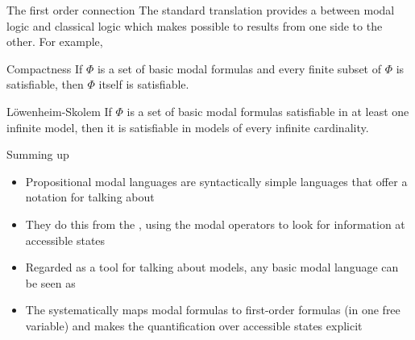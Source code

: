 \documentclass{beamer}
\begin{document}
\begin{slide}{The first order connection}\label{s:22}
\small
The standard translation provides a  between modal logic and classical logic
which makes possible to  results from one side to the other. For example,
\vspace{0.2cm}

\begin{block}{Compactness}
If $\Phi$ is a set of basic modal formulas and every finite subset of $\Phi$ is satisfiable, then $\Phi$ itself is satisfiable.
\end{block}

\begin{block}{L\"owenheim-Skolem}
If $\Phi$ is a set of basic modal formulas  satisfiable in at least one infinite model, then it is satisfiable in models of every infinite cardinality.
\end{block}
\end{slide}


\begin{slide}{Summing up}\label{s:23}
\small
\begin{itemize}
\item Propositional modal languages are syntactically simple languages that offer a  notation for talking about 
\item They do this from the , using the modal operators to look for information at accessible states
 \item Regarded as a tool for talking about models, any basic modal language can be seen as 
 \item The  systematically maps modal formulas to first-order formulas (in one free variable) and makes the quantification over accessible states explicit
\end{itemize}
\end{slide}
\end{document}
